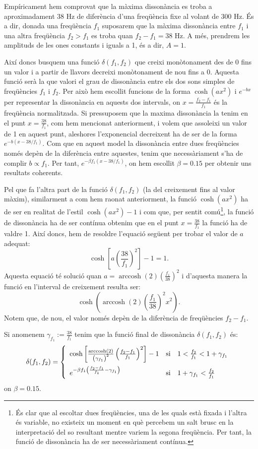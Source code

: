 \documentclass{article}
\theoremstyle{definition}
\DeclareMathOperator{\arccosh}{arccosh}
\begin{document}
Empíricament hem comprovat que la màxima dissonància es troba a aproximadament 38 Hz de diferència d'una freqüència fixe al volant de 300 Hz. És a dir, donada una freqüència $f_1$ suposarem que la màxima dissonància entre $f_1$ i una altra freqüència $f_2>f_1$ es troba quan $f_2-f_1=38\text{ Hz}$. A més, prendrem les amplituds de les ones constants i iguals a 1, és a dir, $A=1$.\par Així doncs busquem una funció $\delta(f_1,f_2)$ que creixi monòtonament des de 0 fins un valor i a partir de llavors decreixi monòtonament de nou fins a 0. Aquesta funció serà la que valori el grau de dissonància entre els dos sons simples de freqüències $f_1$ i $f_2$. Per això hem escollit funcions de la forma $\cosh\left(ax^2\right)$ i $e^{-bx}$ per representar la dissonància en aquests dos intervals, on $x=\frac{f_2-f_1}{f_1}$ és la freqüència normalitzada. Si pressuposem que la maxima dissonància la tenim en el punt $x=\frac{38}{f_1}$, com hem mencionat anteriorment, i volem que assoleixi un valor de 1 en aquest punt, aleshores l'exponencial decreixent ha de ser de la forma $e^{-b\left(x-38/f_1\right)}$. Com que en aquest model la dissonància entre dues freqüències només depèn de la diferència entre aquestes, tenim que necessàriament s'ha de complir $b\propto f_1$. Per tant, $e^{-\beta f_1(x-38/f_1)}$, on hem escollit $\beta=0.15$ per obtenir uns resultats coherents.\par Pel que fa l'altra part de la funció $\delta(f_1,f_2)$ (la del creixement fins al valor màxim), similarment a com hem raonat anteriorment, la funció $\cosh\left(ax^2\right)$ ha de ser en realitat de l'estil $\cosh\left(ax^2\right)-1$ i com que, per sentit comú\footnote{És clar que al escoltar dues freqüències, una de les quals està fixada i l'altra és variable, no existeix un moment en què percebem un salt brusc en la interpretació del so resultant mentre variem la segona freqüència. Per tant, la funció de dissonància ha de ser necessàriament contínua.}, la funció de dissonància ha de ser contínua obtenim que en el punt $x=\frac{38}{f_1}$ la funció ha de valdre 1. Així doncs, hem de resoldre l'equació següent per trobar el valor de $a$ adequat:
$$\cosh\left[a\left(\frac{38}{f_1}\right)^2\right]-1=1.$$ Aquesta equació té solució quan $a=\arccosh(2)\left(\frac{f_1}{38}\right)^2$ i d'aquesta manera la funció en l'interval de creixement resulta ser: $$\cosh\left(\arccosh(2)\left(\frac{f_1}{38}\right)^2x^2\right).$$ Notem que, de nou, el valor només depèn de la diferència de freqüències $f_2-f_1$.\par Si anomenem $\gamma_{f_1}:=\frac{38}{f_1}$ tenim que la funció final de dissonància $\delta(f_1,f_2)$ és: $$\delta(f_1,f_2)=
    \left\{\begin{array}{lll}
        \cosh\left[\frac{\arccosh(2)}{\left(\gamma_{f_1}\right)^2}\left(\frac{f_2-f_1}{f_1}\right)^2\right]-1 & \text{si} & 1<\frac{f_2}{f_1}<1+\gamma_{f_1}\vspace{5pt}\\
        e^{-\beta f_1\left(\frac{f_2-f_1}{f_1}-\gamma_{f_1}\right)} & \text{si} & 1+\gamma_{f_1}<\frac{f_2}{f_1}
    \end{array}\right.$$ on $\beta=0.15$.
\end{document}
